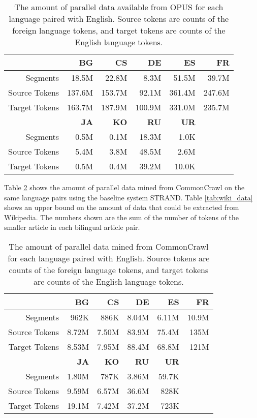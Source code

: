 \begin{table}
\begin{center}
\begin{tabular}{|r||r|r|r|r|r|}
\hline
& \textbf{BG} & \textbf{CS} & \textbf{DE} & \textbf{ES} & \textbf{FR} \\
\hline
Segments      & 18.5M  & 22.8M  & 8.3M   & 51.5M  & 39.7M  \\
\hline
Source Tokens & 137.6M & 153.7M & 92.1M  & 361.4M & 247.6M \\
\hline
Target Tokens & 163.7M & 187.9M & 100.9M & 331.0M & 235.7M \\
\hline
\hline
& \textbf{JA} & \textbf{KO} & \textbf{RU} & \textbf{UR} & \\
\hline
Segments      & 0.5M  & 0.1M  & 18.3M   & 1.0K  & \\
\hline
Source Tokens & 5.4M  & 3.8M  & 48.5M   & 2.6M  & \\
\hline
Target Tokens & 0.5M  & 0.4M  & 39.2M   & 10.0K & \\
\hline
\end{tabular}
\end{center}
\caption{The amount of parallel data available from OPUS \citep{OPUS} for each
language paired with English. Source tokens are counts of the foreign language
tokens, and target tokens are counts of the English language tokens.}
\label{tab:opus_data}
\end{table}

Table \ref{tab:cc_data} shows the amount of parallel data mined from CommonCrawl
on the same language pairs using the baseline system STRAND. Table
\ref{tab:wiki_data} shows an upper bound on the amount of data that could be
extracted from Wikipedia. The numbers shown are the sum of the number of tokens
of the smaller article in each bilingual article pair.

\begin{table}
\begin{center}
\begin{tabular}{|r||r|r|r|r|r|}
\hline
& \textbf{BG} & \textbf{CS} & \textbf{DE} & \textbf{ES} & \textbf{FR} \\
\hline
Segments      & 962K  & 886K  & 8.04M & 6.11M & 10.9M  \\
\hline
Source Tokens & 8.72M & 7.50M & 83.9M & 75.4M & 135M \\
\hline
Target Tokens & 8.53M & 7.95M & 88.4M & 68.8M & 121M \\
\hline
\hline
& \textbf{JA} & \textbf{KO} & \textbf{RU} & \textbf{UR} & \\
\hline
Segments      & 1.80M  & 787K   & 3.86M   & 59.7K & \\
\hline
Source Tokens & 9.59M  & 6.57M  & 36.6M   & 828K & \\
\hline
Target Tokens & 19.1M  & 7.42M  & 37.2M   & 723K & \\
\hline
\end{tabular}
\end{center}
\caption{The amount of parallel data mined from CommonCrawl for each
language paired with English. Source tokens are counts of the foreign language
tokens, and target tokens are counts of the English language tokens.}
\label{tab:cc_data}
\end{table}

